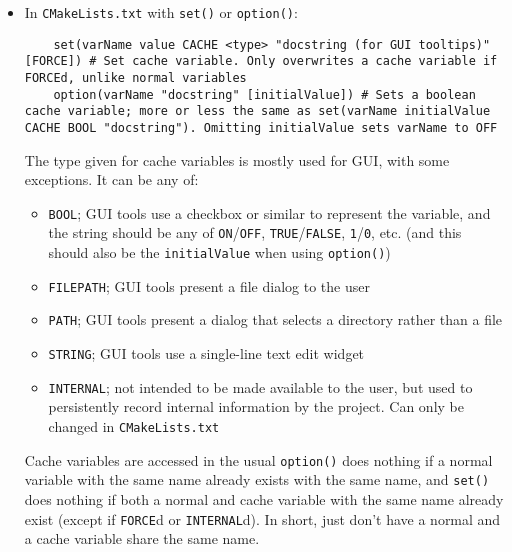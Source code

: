 \documentclass[8pt, table, xcdraw]{article}%
\begin{document}
\begin{itemize}
    \item In \lstinline{CMakeLists.txt} with \lstinline{set()} or \lstinline{option()}:
    
    \begin{lstlisting}
    set(varName value CACHE <type> "docstring (for GUI tooltips)" [FORCE]) # Set cache variable. Only overwrites a cache variable if FORCEd, unlike normal variables
    option(varName "docstring" [initialValue]) # Sets a boolean cache variable; more or less the same as set(varName initialValue CACHE BOOL "docstring"). Omitting initialValue sets varName to OFF
    \end{lstlisting}
    
    The type given for cache variables is mostly used for GUI, with some exceptions. It can be any of:
    
    \begin{itemize}
        \item \lstinline{BOOL}; GUI tools use a checkbox or similar to represent the
    variable, and the string should be any of \lstinline{ON}/\lstinline{OFF}, \lstinline{TRUE}/\lstinline{FALSE}, \lstinline{1}/\lstinline{0}, etc. (and this should also be the \lstinline{initialValue} when using \lstinline{option()})
        \item \lstinline{FILEPATH}; GUI tools present a file dialog to the user
        \item \lstinline{PATH}; GUI tools present a dialog that selects a directory rather than a file
        \item \lstinline{STRING}; GUI tools use a single-line text edit widget
        \item \lstinline{INTERNAL}; not intended to be made available to the user, but used to persistently record internal information by the project. Can only be changed in \lstinline{CMakeLists.txt}
    \end{itemize}
    
    Cache variables are accessed in the usual %
    \lstinline{option()} does nothing if a normal variable with the same name already exists with the same name, and \lstinline{set()} does nothing if both a normal and cache variable with the same name already exist (except if \lstinline{FORCE}d or \lstinline{INTERNAL}d). In short, just don't have a normal and a cache variable share the same name.
    

\end{itemize}
\end{document}
